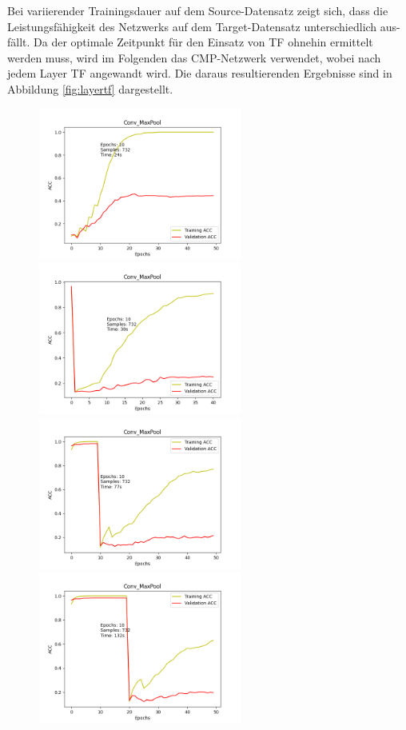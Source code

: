 Bei variierender Trainingsdauer auf dem Source-Datensatz zeigt sich, dass die Leistungsfähigkeit des Netzwerks auf dem Target-Datensatz 
unterschiedlich aus-fällt. Da der optimale Zeitpunkt für den Einsatz von TF ohnehin ermittelt werden muss, wird im 
Folgenden das CMP-Netzwerk verwendet, wobei nach jedem Layer TF angewandt wird. Die daraus resultierenden Ergebnisse sind in Abbildung 
\ref{fig:layertf} dargestellt.

\begin{figure}[htpb]
    \includegraphics[height=5cm]{../../Plots/ba_plots/convmaxpool/wotr.png}
    \includegraphics[height=5cm]{../../Plots/ba_plots/convmaxpool/epochTFtr.png}
    \includegraphics[height=5cm]{../../Plots/ba_plots/convmaxpool/1TFtr.png}
    \includegraphics[height=5cm]{../../Plots/ba_plots/convmaxpool/2TFtr.png}

\end{figure}
